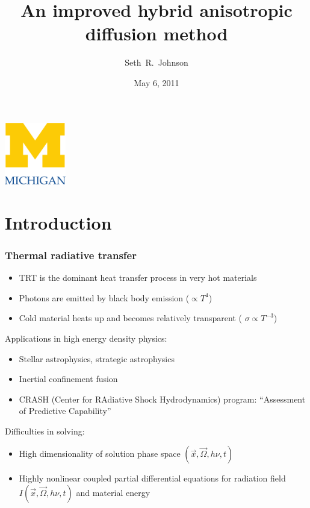 \documentclass[draft]{beamer}
\title[ORNL Seminar]%
{An improved hybrid anisotropic diffusion method}
\author[SRJ]{Seth~R.~Johnson}
\institute[UMich]{
University of Michigan, Ann Arbor
}
\date[5/6/2011]{May 6, 2011}
\begin{document}

\begin{frame}
\titlepage
\begin{center}
  \includegraphics[width=0.2\textwidth]{../figures/umlogo}
\end{center}
\end{frame}

\section{Introduction}
\begin{frame}
  \frametitle{Thermal radiative transfer}
  \begin{itemize}
    \item TRT is the dominant heat transfer process in very hot materials
    \item Photons are emitted by black body emission ($\propto T^4$)
    \item Cold material heats up and becomes relatively transparent (
      $\sigma\propto T^{-3}$)
  \end{itemize}

  Applications in high energy density physics:
  \begin{itemize}
    \item Stellar astrophysics, \textcolor[gray]{.5}{strategic astrophysics}
    \item Inertial confinement fusion
    \item CRASH (Center for RAdiative Shock Hydrodynamics) program: ``Assessment
          of Predictive Capability''
  \end{itemize}
  Difficulties in solving:
  \begin{itemize}
    \item High dimensionality of solution phase space $(\vec{x}, \vec{\Omega},
      h\nu, t)$
    \item Highly nonlinear coupled partial differential equations for radiation
      field $I(\vec{x}, \vec{\Omega}, h\nu, t)$ and material energy
  \end{itemize}
\end{frame}
\end{document}
